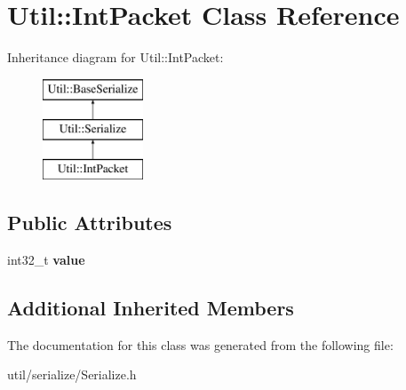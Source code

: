 \hypertarget{class_util_1_1_int_packet}{}\section{Util\+:\+:Int\+Packet Class Reference}
\label{class_util_1_1_int_packet}
Inheritance diagram for Util\+:\+:Int\+Packet\+:\begin{figure}[H]
\begin{center}
\leavevmode
\includegraphics[height=3.000000cm]{class_util_1_1_int_packet}
\end{center}
\end{figure}
\subsection*{Public Attributes}
\begin{DoxyCompactItemize}
\item 
\mbox{\label{class_util_1_1_int_packet_af245b2ee6510410bca9880681fd6754e}} 
int32\+\_\+t {\bfseries value}
\end{DoxyCompactItemize}
\subsection*{Additional Inherited Members}


The documentation for this class was generated from the following file\+:\begin{DoxyCompactItemize}
\item 
util/serialize/Serialize.\+h\end{DoxyCompactItemize}
